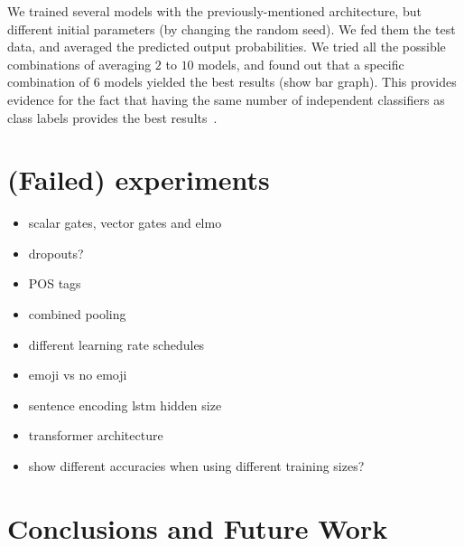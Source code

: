 \documentclass[11pt,a4paper]{article}
\begin{document}
We trained several models with the previously-mentioned architecture, but
different initial parameters (by changing the random seed). We fed them the test
data, and averaged the predicted output probabilities. We tried all the possible
combinations of averaging $2$ to $10$ models, and found out that a specific
combination of $6$ models yielded the best results (show bar graph). This
provides evidence for the fact that having the same number of independent
classifiers as class labels provides the best results~\cite{bonab2016theoretical}.


\section{(Failed) experiments}
\begin{itemize}
    \item scalar gates, vector gates and elmo
    \item dropouts?
    \item POS tags
    \item combined pooling
    \item different learning rate schedules
    \item emoji vs no emoji
    \item sentence encoding lstm hidden size
    \item transformer architecture
    \item show different accuracies when using different training sizes?
\end{itemize}

\section{Conclusions and Future Work}




\end{document}
